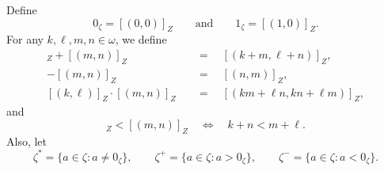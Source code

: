 \documentclass[11pt]{article}
\begin{document}
\begin{definition}
  Define
  \begin{equation*}
    0_\zeta = [(0, 0)]_Z \qquad \text{and} \qquad 1_\zeta = [(1, 0)]_Z.
  \end{equation*}
  For any $k, \ell, m, n \in \omega$, we define
  \begin{align*}
    [(k, \ell)]_Z + [(m, n)]_Z \quad &= \quad [(k + m, \ell + n)]_Z, \\
    -[(m, n)]_Z \quad &= \quad [(n, m)]_Z, \\
    [(k, \ell)]_Z \cdot [(m, n)]_Z \quad &= \quad [(km + \ell n, kn + \ell m)]_Z,
  \end{align*}
  and
  \begin{equation*}
    [(k, \ell)]_Z < [(m, n)]_Z \quad \iff \quad k + n < m + \ell.
  \end{equation*}
  Also, let
  \begin{equation*}
    \zeta^* = \{a \in \zeta: a \neq 0_\zeta\}, \qquad
    \zeta^+ = \{a \in \zeta: a > 0_\zeta\}, \qquad
    \zeta^- = \{a \in \zeta: a < 0_\zeta\}.
  \end{equation*}
\end{definition}
\end{document}
